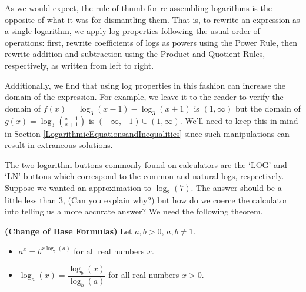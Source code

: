 \documentclass{ximera}
\begin{document}
As we would expect, the rule of thumb for re-assembling logarithms is the opposite of what it was for dismantling them.  That is, to rewrite an expression as a single logarithm, we apply log properties following the usual order of operations:  first,  rewrite coefficients of logs as powers using the Power Rule, then rewrite addition and subtraction using the Product and Quotient Rules, respectively, as written from left to right.

\smallskip

Additionally, we find that using log properties in this fashion can increase the domain of the expression.  For example, we leave it to the reader to verify the domain of $f(x) = \log_{3}(x-1) - \log_{3}(x+1)$ is $(1,\infty)$ but the domain of $g(x) = \log_{3}\left(\frac{x-1}{x+1}\right)$ is $(-\infty, -1) \cup (1, \infty)$.  We'll need to keep this in mind in Section \ref{LogarithmicEquationsandInequalities} since such manipulations can result in extraneous solutions.

\smallskip

The two logarithm buttons commonly found on calculators are the `LOG' and `LN' buttons which correspond to the common and natural logs, respectively.  Suppose we wanted an approximation to $\log_{2}(7)$.  The answer should be a little less than $3$, (Can you explain why?) but how do we coerce the calculator into telling us a more accurate answer?  We need the following theorem.

\smallskip

\colorbox{ResultColor}{\bbm

\begin{thm} \label{changeofbase} \textbf{(Change of Base Formulas)} Let $a,b >0$, $a,b \neq 1$.   

\begin{itemize}

\item  $a^{x} = b^{x \log_{b}(a)}$ for all real numbers $x$.

\item  $\log_{a}(x) = \dfrac{\log_{b}(x)}{\log_{b}(a)}$ for all real numbers $x > 0$.

\end{itemize}

\end{thm}

\ebm}

\smallskip
\end{document}

